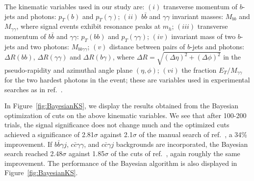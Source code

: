 
%


The  kinematic variables used in our  study are:
$(i)$ transverse momentum of $b$-jets and photons: $p_T(b)$ and $p_T(\gamma)$; 
$(ii)$ $b\bar{b}$ and $\gamma\gamma$ invariant masses: $M_{bb}$ and $M_{\gamma\gamma}$, where signal events exhibit resonance peaks at $m_h$;
$(iii)$ transverse momentum of $b\bar{b}$ and $\gamma\gamma$: $p_T(bb)$ and $p_T(\gamma\gamma)$; 
$(iv)$ invariant mass of two $b$-jets and two photons: $M_{bb\gamma\gamma}$;
$(v)$ distance between pairs of $b$-jets and photons: $\Delta R(bb)$, $\Delta R(\gamma\gamma)$ and $\Delta R(b\gamma)$, where
$\Delta R=\sqrt{(\Delta\eta)^2+(\Delta\phi)^2}$ in the pseudo-rapidity and azimuthal angle plane $(\eta,\phi)$;
$(vi)$ the fraction $E_T/M_{\gamma\gamma}$ for the two hardest photons in the event; these are variables used in experimental searches as in ref.~\cite{Aad:2014yja, CMS}.

In Figure~\ref{fig:BayesianKS}, we display the results obtained from the Bayesian optimization of cuts on the above kinematic variables. We see that after 100-200 trials, the signal significance does not change much and the optimized cuts achieved a significance of 2.81$\sigma$ against 2.1$\sigma$ of the manual search of ref.~\cite{Azatov:2015oxa}, a 34\% improvement. If $b\bar{b}\gamma j$, $c\bar{c}\gamma\gamma$, and $c\bar{c}\gamma j$ backgrounds are incorporated, the Bayesian search reached 2.48$\sigma$ against 1.85$\sigma$ of the cuts of ref.~\cite{Azatov:2015oxa}, again roughly the same improvement. %
The performance of the Bayesian algorithm is also displayed in Figure~\ref{fig:BayesianKS}.

